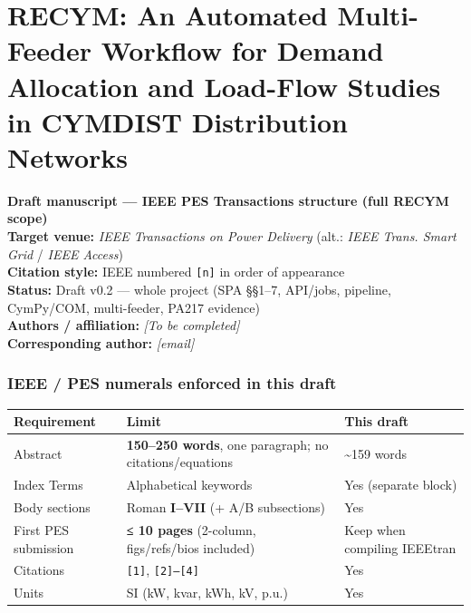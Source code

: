 \documentclass[
  11pt,
]{article}
\author{}
\date{}
\newcounter{none} %
\begin{document}
\section{RECYM: An Automated Multi-Feeder Workflow for Demand Allocation
and Load-Flow Studies in CYMDIST Distribution
Networks}\label{recym-an-automated-multi-feeder-workflow-for-demand-allocation-and-load-flow-studies-in-cymdist-distribution-networks}

\textbf{Draft manuscript — IEEE PES Transactions structure (full RECYM
scope)}\\
\textbf{Target venue:} \emph{IEEE Transactions on Power Delivery} (alt.:
\emph{IEEE Trans. Smart Grid} / \emph{IEEE Access})\\
\textbf{Citation style:} IEEE numbered \texttt{{[}n{]}} in order of
appearance\\
\textbf{Status:} Draft v0.2 — whole project (SPA §§1–7, API/jobs,
pipeline, CymPy/COM, multi-feeder, PA217 evidence)\\
\textbf{Authors / affiliation:} \emph{{[}To be completed{]}}\\
\textbf{Corresponding author:} \emph{{[}email{]}}

\subsubsection{IEEE / PES numerals enforced in this
draft}\label{ieee-pes-numerals-enforced-in-this-draft}

{\def\LTcaptype{none} %
\begin{longtable}[]{@{}
  >{\raggedright\arraybackslash}p{}
  >{\raggedright\arraybackslash}p{}
  >{\raggedright\arraybackslash}p{}@{}}
\toprule\noalign{}
\begin{minipage}[b]{\linewidth}\raggedright
Requirement
\end{minipage} & \begin{minipage}[b]{\linewidth}\raggedright
Limit
\end{minipage} & \begin{minipage}[b]{\linewidth}\raggedright
This draft
\end{minipage} \\
\midrule\noalign{}
\endhead
\bottomrule\noalign{}
\endlastfoot
Abstract & \textbf{150–250 words}, one paragraph; no citations/equations
& \textasciitilde159 words \\
Index Terms & Alphabetical keywords & Yes (separate block) \\
Body sections & Roman \textbf{I–VII} (+ A/B subsections) & Yes \\
First PES submission & \textbf{≤ 10 pages} (2-column, figs/refs/bios
included) & Keep when compiling IEEEtran \\
Citations & \texttt{{[}1{]}}, \texttt{{[}2{]}–{[}4{]}} & Yes \\
Units & SI (kW, kvar, kWh, kV, p.u.) & Yes \\
\end{longtable}
}
\end{document}
